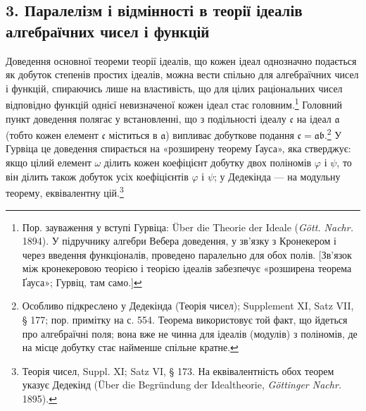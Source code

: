 \documentclass[11pt]{article}
\providecommand{\frc}{\mathfrak c}
\providecommand{\fra}{\mathfrak a}
\providecommand{\frb}{\mathfrak b}
\begin{document}
\subsection*{3. Паралелізм і відмінності в теорії ідеалів алгебраїчних чисел і функцій}
Доведення основної теореми теорії ідеалів, що кожен ідеал однозначно подається як добуток степенів простих ідеалів, можна вести спільно для алгебраїчних чисел і функцій, спираючись лише на властивість, що для цілих раціональних чисел відповідно функцій однієї невизначеної кожен ідеал стає головним.\footnote{Пор. зауваження у вступі Гурвіца: Über die Theorie der Ideale (\emph{Gött. Nachr.} 1894). У підручнику алгебри Вебера доведення, у зв'язку з Кронекером і через введення функціоналів, проведено паралельно для обох полів. [Зв'язок між кронекеровою теорією і теорією ідеалів забезпечує «розширена теорема Ґауса»; Гурвіц, там само.]} Головний пункт доведення полягає у встановленні, що з подільності ідеалу \(\frc\) на ідеал \(\fra\) (тобто кожен елемент \(\frc\) міститься в \(\fra\)) випливає добуткове подання \(\frc=\fra\frb\).\footnote{Особливо підкреслено у Дедекінда (Теорія чисел); Supplement XI, Satz VII, § 177; пор. примітку на с. 554. Теорема використовує той факт, що йдеться про алгебраїчні поля; вона вже не чинна для ідеалів (модулів) з поліномів, де на місце добутку стає найменше спільне кратне.} У Гурвіца це доведення спирається на «розширену теорему Ґауса», яка стверджує: якщо цілий елемент \(\omega\) ділить кожен коефіцієнт добутку двох поліномів \(\varphi\) і \(\psi\), то він ділить також добуток усіх коефіцієнтів \(\varphi\) і \(\psi\); у Дедекінда --- на модульну теорему, еквівалентну цій.\footnote{Теорія чисел, Suppl. XI; Satz VI, § 173. На еквівалентність обох теорем указує Дедекінд (Über die Begründung der Idealtheorie, \emph{Göttinger Nachr.} 1895).}
\end{document}
